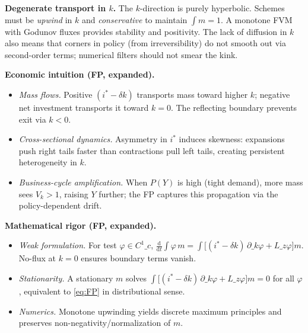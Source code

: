 \documentclass[11pt,letterpaper,oneside]{article}
\numberwithin{equation}{section}
\newcommand{\ac}[1]{{\mdseries\textsc{#1}}}
\newcommand{\1}{\mathbf{1}}
\newcommand{\Lz}{L\_z}
\begin{document}
\begin{tcolorbox}[mathstyle]
\textbf{Degenerate transport in $k$.} The $k$-direction is purely hyperbolic. Schemes must be \emph{upwind} in $k$ and \emph{conservative} to maintain $\int m=1$. A monotone \ac{FVM} with Godunov fluxes provides stability and positivity. The lack of diffusion in $k$ also means that corners in policy (from irreversibility) do not smooth out via second-order terms; numerical filters should not smear the kink.
\end{tcolorbox}

\begin{tcolorbox}[didacticstyle]
\textbf{Economic intuition (FP, expanded).}
\begin{itemize}[leftmargin=1.15em,itemsep=0.25em]
  \item \emph{Mass flows.} Positive $(i^*-\delta k)$ transports mass toward higher $k$; negative net investment transports it toward $k=0$. The reflecting boundary prevents exit via $k<0$.
  \item \emph{Cross-sectional dynamics.} Asymmetry in $i^*$ induces skewness: expansions push right tails faster than contractions pull left tails, creating persistent heterogeneity in $k$.
  \item \emph{Business-cycle amplification.} When $P(Y)$ is high (tight demand), more mass sees $V_k>1$, raising $Y$ further; the FP captures this propagation via the policy-dependent drift.
\end{itemize}
\end{tcolorbox}

\begin{tcolorbox}[mathstyle]
\textbf{Mathematical rigor (FP, expanded).}
\begin{itemize}[leftmargin=1.15em,itemsep=0.25em]
  \item \emph{Weak formulation.} For test $\varphi\in C^1\_c$, $\frac{\mathrm d}{\mathrm dt}\int \varphi\,m=\int \big[(i^*-\delta k)\,\partial\_k\varphi + \Lz\varphi\big] m$. No-flux at $k=0$ ensures boundary terms vanish.
  \item \emph{Stationarity.} A stationary $m$ solves $\int \big[(i^*-\delta k)\,\partial\_k\varphi + \Lz\varphi\big] m=0$ for all $\varphi$, equivalent to \eqref{eq:FP} in distributional sense.
  \item \emph{Numerics.} Monotone upwinding yields discrete maximum principles and preserves non-negativity/normalization of $m$.
\end{itemize}
\end{tcolorbox}
\end{document}
